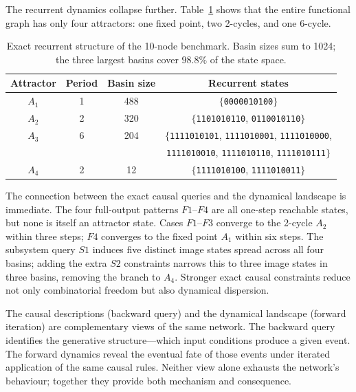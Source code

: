 \documentclass[11pt]{article}
\begin{document}
The recurrent dynamics collapse further.  Table~\ref{tab:attractors} shows
that the entire functional graph has only four attractors: one fixed point,
two 2-cycles, and one 6-cycle.

\begin{table}[h]
\centering
\small
\begin{tabular}{cccc}
\toprule
Attractor & Period & Basin size & Recurrent states \\
\midrule
$A_1$ & 1 & 488 & $\{$\texttt{0000010100}$\}$ \\
$A_2$ & 2 & 320 & $\{$\texttt{1101010110}, \texttt{0110010110}$\}$ \\
$A_3$ & 6 & 204 & $\{$\texttt{1111010101}, \texttt{1111010001}, \texttt{1111010000},\\
      &   &     & \phantom{$\{$}\texttt{1111010010}, \texttt{1111010110}, \texttt{1111010111}$\}$ \\
$A_4$ & 2 & 12  & $\{$\texttt{1111010100}, \texttt{1111010011}$\}$ \\
\bottomrule
\end{tabular}
\caption{Exact recurrent structure of the 10-node benchmark.  Basin sizes
sum to 1024; the three largest basins cover $98.8\%$ of the state space.}
\label{tab:attractors}
\end{table}

The connection between the exact causal queries and the dynamical landscape
is immediate.  The four full-output patterns $F1$--$F4$ are all one-step
reachable states, but none is itself an attractor state.  Cases $F1$--$F3$
converge to the 2-cycle $A_2$ within three steps; $F4$ converges to the
fixed point $A_1$ within six steps.  The subsystem query $S1$ induces five
distinct image states spread across all four basins; adding the extra $S2$
constraints narrows this to three image states in three basins, removing
the branch to $A_4$.  Stronger exact causal constraints reduce not only
combinatorial freedom but also dynamical dispersion.

The causal descriptions (backward query) and the dynamical landscape
(forward iteration) are complementary views of the same network.  The
backward query identifies the generative structure---which input conditions
produce a given event.  The forward dynamics reveal the eventual fate of
those events under iterated application of the same causal rules.  Neither
view alone exhausts the network's behaviour; together they provide both
mechanism and consequence.
\end{document}
